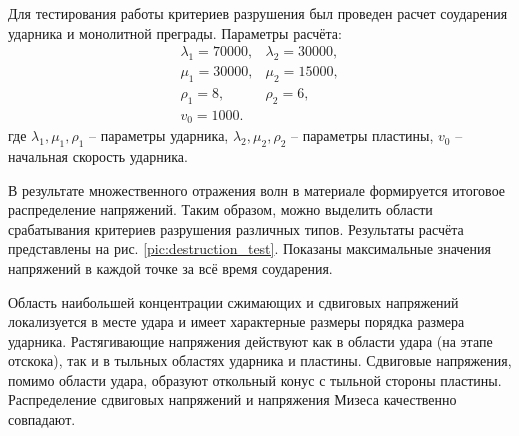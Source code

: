 Для тестирования работы критериев разрушения был проведен расчет соударения ударника и монолитной преграды. Параметры расчёта:
\begin{eqnarray}
\lambda_1=70000, & \lambda_2=30000, \\
\mu_1=30000, & \mu_2=15000, \\
\rho_1=8, & \rho_2=6, \\
v_0 = 1000.
\end{eqnarray}
где $\lambda_1, \mu_1, \rho_1$ -- параметры ударника, $\lambda_2, \mu_2, \rho_2$ -- параметры пластины, $v_0$ -- начальная скорость ударника.

В результате множественного отражения волн в материале формируется итоговое распределение напряжений. Таким образом, можно выделить области срабатывания критериев разрушения различных типов. Результаты расчёта представлены на рис. \ref{pic:destruction_test}. Показаны максимальные значения напряжений в каждой точке за всё время соударения.

Область наибольшей концентрации сжимающих и сдвиговых напряжений локализуется в месте удара и имеет характерные размеры порядка размера ударника. Растягивающие напряжения действуют как в области удара (на этапе отскока), так и в тыльных областях ударника и пластины. Сдвиговые напряжения, помимо области удара, образуют откольный конус с тыльной стороны пластины. Распределение сдвиговых напряжений и напряжения Мизеса качественно совпадают.

